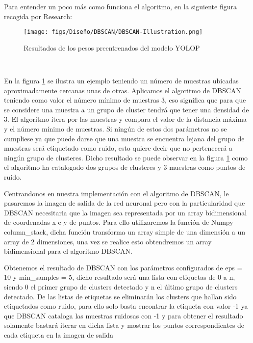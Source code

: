 Para entender un poco más como funciona el algoritmo, en la siguiente figura recogida por Research: 

\begin{figure} [H]
  \begin{center}
    \texttt{[image: figs/Diseño/DBSCAN/DBSCAN-Illustration.png]}
  \end{center}
  \caption{Resultados de los pesos preentrenados del modelo YOLOP}
  \label{fig:pesos_preentrenados}
\end{figure}\

En la figura \ref{fig:pesos_preentrenados} se ilustra un ejemplo teniendo un número de muestras ubicadas aproximadamente cercanas unas de otras. Aplicamos el algoritmo de DBSCAN 
teniendo como valor el número mínimo de muestras 3, eso significa que para que se considere una muestra a un grupo de cluster tendrá que tener una densidad de 3. El algoritmo itera por
las muestras y compara el valor de la distancia máxima y el número mínimo de muestras. 
Si ningún de estos dos parámetros no se cumpliese ya que puede darse que una muestra se encuentra lejana del grupo de muestras será etiquetado como ruido, esto quiere decir
que no pertenecerá a ningún grupo de clusteres. Dicho resultado se puede observar en la figura \ref{fig:pesos_preentrenados} como el algoritmo ha catalogado dos grupos de clusteres y 3 muestras
como puntos de ruido. 
\break

Centrandonos en nuestra implementación con el algoritmo de DBSCAN, le pasaremos la imagen de salida de la red neuronal pero con la particularidad que DBSCAN necesitaria que la imagen sea
representada por un array bidimensional de coordenadas x e y de puntos. Para ello utilizaremos la función de Numpy column\_stack, dicha función transforma un array simple de una dimensión a
un array de 2 dimensiones, una vez se realice esto obtendremos un array bidimensional para el algoritmo DBSCAN.\newline

Obtenemos el resultado de DBSCAN con los parámetros configurados de eps = 10 y min\_samples = 5, dicho resultado será una lista con etiquetas de 0 a n, siendo 0 el primer grupo de clusters detectado y 
n el último grupo de clusters detectado. De las listas de etiquetas se eliminarán los clusters que hallan sido etiquetados como ruido, para ello solo basta encontrar la etiqueta con valor -1 ya que
DBSCAN cataloga las muestras ruidosas con -1 y para obtener el resultado solamente bastará iterar en dicha lista y mostrar los puntos correspondientes de cada etiqueta en la imagen de salida


